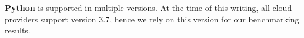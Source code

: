 
\textbf{Python} is supported in multiple versions. %
At the time of this writing, all cloud providers support version 3.7, hence we rely on this version for our benchmarking results.



